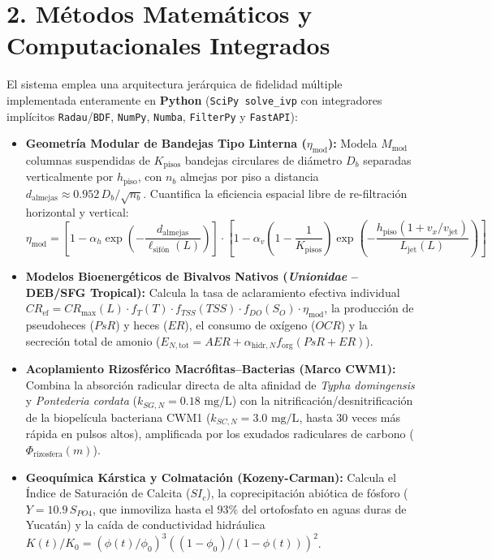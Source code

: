 \documentclass[11pt,letterpaper]{article}
\begin{document}
\section*{2. Métodos Matemáticos y Computacionales Integrados}
El sistema emplea una arquitectura jerárquica de fidelidad múltiple implementada enteramente en \textbf{Python} (\texttt{SciPy solve\_ivp} con integradores implícitos \texttt{Radau}/\texttt{BDF}, \texttt{NumPy}, \texttt{Numba}, \texttt{FilterPy} y \texttt{FastAPI}):

\begin{itemize}[leftmargin=1.5em]
    \item \textbf{Geometría Modular de Bandejas Tipo Linterna ($\eta_{\text{mod}}$):} Modela $M_{\text{mod}}$ columnas suspendidas de $K_{\text{pisos}}$ bandejas circulares de diámetro $D_b$ separadas verticalmente por $h_{\text{piso}}$, con $n_b$ almejas por piso a distancia $d_{\text{almejas}} \approx 0.952\,D_b/\sqrt{n_b}$. Cuantifica la eficiencia espacial libre de re-filtración horizontal y vertical:
    \[
        \eta_{\text{mod}} = \left[1 - \alpha_h \exp\!\left(-\frac{d_{\text{almejas}}}{\ell_{\text{sifón}}(L)}\right)\right] \cdot \left[1 - \alpha_v \left(1 - \frac{1}{K_{\text{pisos}}}\right)\exp\!\left(-\frac{h_{\text{piso}}(1 + v_x/v_{\text{jet}})}{L_{\text{jet}}(L)}\right)\right]
    \]
    \item \textbf{Modelos Bioenergéticos de Bivalvos Nativos (\textit{Unionidae} -- DEB/SFG Tropical):} Calcula la tasa de aclaramiento efectiva individual $CR_{\text{ef}} = CR_{\max}(L)\cdot f_T(T)\cdot f_{TSS}(TSS)\cdot f_{DO}(S_O)\cdot \eta_{\text{mod}}$, la producción de pseudoheces ($PsR$) y heces ($ER$), el consumo de oxígeno ($OCR$) y la secreción total de amonio ($E_{N,\text{tot}} = AER + \alpha_{\text{hidr},N} f_{\text{org}}(PsR+ER)$).
    \item \textbf{Acoplamiento Rizosférico Macrófitas--Bacterias (Marco CWM1):} Combina la absorción radicular directa de alta afinidad de \textit{Typha domingensis} y \textit{Pontederia cordata} ($k_{SG,N} = 0.18\text{ mg/L}$) con la nitrificación/desnitrificación de la biopelícula bacteriana CWM1 ($k_{SC,N} = 3.0\text{ mg/L}$, hasta $30$ veces más rápida en pulsos altos), amplificada por los exudados radiculares de carbono ($\Phi_{\text{rizosfera}}(m)$).
    \item \textbf{Geoquímica Kárstica y Colmatación (Kozeny-Carman):} Calcula el Índice de Saturación de Calcita ($SI_c$), la coprecipitación abiótica de fósforo ($Y = 10.9\,S_{PO4}$, que inmoviliza hasta el $93\%$ del ortofosfato en aguas duras de Yucatán) y la caída de conductividad hidráulica $K(t)/K_0 = (\phi(t)/\phi_0)^3((1-\phi_0)/(1-\phi(t)))^2$.
\end{itemize}
\end{document}

